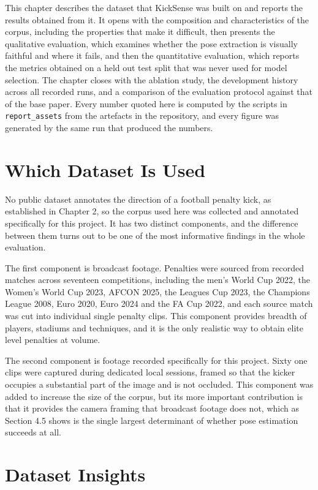 This chapter describes the dataset that KickSense was built on and reports the results obtained from it. It opens with the composition and characteristics of the corpus, including the properties that make it difficult, then presents the qualitative evaluation, which examines whether the pose extraction is visually faithful and where it fails, and then the quantitative evaluation, which reports the metrics obtained on a held out test split that was never used for model selection. The chapter closes with the ablation study, the development history across all recorded runs, and a comparison of the evaluation protocol against that of the base paper. Every number quoted here is computed by the scripts in \texttt{report\_assets} from the artefacts in the repository, and every figure was generated by the same run that produced the numbers.

\section{Which Dataset Is Used}

No public dataset annotates the direction of a football penalty kick, as established in Chapter 2, so the corpus used here was collected and annotated specifically for this project. It has two distinct components, and the difference between them turns out to be one of the most informative findings in the whole evaluation.

The first component is broadcast footage. Penalties were sourced from recorded matches across seventeen competitions, including the men's World Cup 2022, the Women's World Cup 2023, AFCON 2025, the Leagues Cup 2023, the Champions League 2008, Euro 2020, Euro 2024 and the FA Cup 2022, and each source match was cut into individual single penalty clips. This component provides breadth of players, stadiums and techniques, and it is the only realistic way to obtain elite level penalties at volume.

The second component is footage recorded specifically for this project. Sixty one clips were captured during dedicated local sessions, framed so that the kicker occupies a substantial part of the image and is not occluded. This component was added to increase the size of the corpus, but its more important contribution is that it provides the camera framing that broadcast footage does not, which as Section 4.5 shows is the single largest determinant of whether pose estimation succeeds at all.

\section{Dataset Insights}


